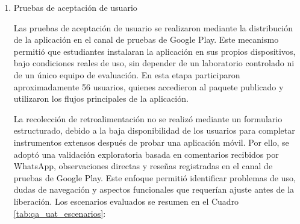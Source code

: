 \begin{enumerate}
La ejecución constituye evidencia técnica válida en el dispositivo HONOR/Huawei evaluado. Se garantizó la estabilidad mediante un entorno sin diálogos del sistema y la configuración dropShaders.enable=false, asegurando la compatibilidad con el receptor de ProfileInstaller.

  \item Pruebas de aceptación de usuario

Las pruebas de aceptación de usuario se realizaron mediante la distribución de la aplicación en el canal de pruebas de Google Play. Este mecanismo permitió que estudiantes instalaran la aplicación en sus propios dispositivos, bajo condiciones reales de uso, sin depender de un laboratorio controlado ni de un único equipo de evaluación. En esta etapa participaron aproximadamente 56 usuarios, quienes accedieron al paquete publicado y utilizaron los flujos principales de la aplicación.

La recolección de retroalimentación no se realizó mediante un formulario estructurado, debido a la baja disponibilidad de los usuarios para completar instrumentos extensos después de probar una aplicación móvil. Por ello, se adoptó una validación exploratoria basada en comentarios recibidos por WhatsApp, observaciones directas y reseñas registradas en el canal de pruebas de Google Play. Este enfoque permitió identificar problemas de uso, dudas de navegación y aspectos funcionales que requerían ajuste antes de la liberación. Los escenarios evaluados se resumen en el Cuadro \ref{tab:qa_uat_escenarios}:


\end{enumerate}
